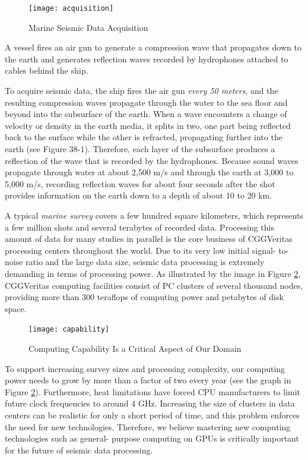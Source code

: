 \documentclass[twocolumn]{article}
\begin{document}
\begin{figure}[htb]
        \centering
        \texttt{[image: acquisition]}
        \caption{Marine Seismic Data Acquisition}
        \label{acquisition}
\end{figure}
A vessel fires an air gun to generate a compression wave that propagates down to the earth and generates reflection waves recorded by hydrophones attached to cables behind the ship.

To acquire seismic data, the ship fires the air gun \emph{every 50 meters}, and the resulting compression waves propagate through the water to the sea floor and beyond into the subsurface of the earth. When a wave encounters a change of velocity or density in the earth media, it splits in two, one part being reflected back to the surface while the other is refracted, propagating further into the earth (see Figure 38-1). Therefore, each layer of the subsurface produces a reflection of the wave that is recorded by the hydrophones. Because sound waves propagate through water at about 2,500 m/s and through the earth at 3,000 to 5,000 m/s, recording reflection waves for about four seconds after the shot provides information on the earth down to a depth of about 10 to 20 km.

A typical \emph{marine survey} covers a few hundred square kilometers, which represents a few million shots and several terabytes of recorded data. Processing this amount of data for many studies in parallel is the core business of CGGVeritas processing centers throughout the world. Due to its very low initial signal- to-noise ratio and the large data size, seismic data processing is extremely demanding in terms of processing power. As illustrated by the image in Figure \ref{capability}, CGGVeritas computing facilities consist of PC clusters of several thousand nodes, providing more than 300 teraflops of computing power and petabytes of disk space.

\begin{figure}[htb]
        \centering
        \texttt{[image: capability]}
        \caption{Computing Capability Is a Critical Aspect of Our Domain}
        \label{capability}
\end{figure}

To support increasing survey sizes and processing complexity, our computing power needs to grow by more than a factor of two every year (see the graph in Figure \ref{capability}). Furthermore, heat limitations have forced CPU manufacturers to limit future clock frequencies to around 4 GHz. Increasing the size of clusters in data centers can be realistic for only a short period of time, and this problem enforces the need for new technologies. Therefore, we believe mastering new computing technologies such as general- purpose computing on GPUs is critically important for the future of seismic data processing.
\end{document}
